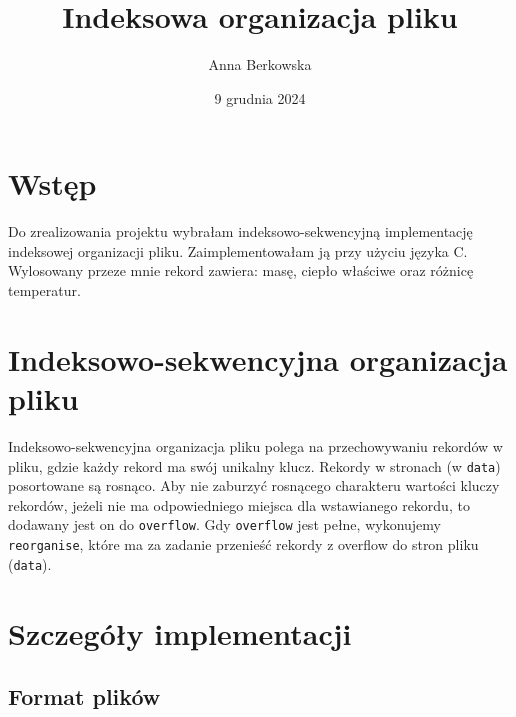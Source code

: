 \documentclass{article}
\title{Indeksowa organizacja pliku}
\author{Anna Berkowska}
\date{9 grudnia 2024}
\begin{document}
    \maketitle
    \section*{Wstęp}

    Do zrealizowania projektu wybrałam indeksowo-sekwencyjną implementację indeksowej organizacji pliku.
    Zaimplementowałam ją przy użyciu języka C. Wylosowany przeze mnie rekord zawiera: masę, ciepło właściwe oraz różnicę temperatur.

    \section*{Indeksowo-sekwencyjna organizacja pliku}

    Indeksowo-sekwencyjna organizacja pliku polega na przechowywaniu rekordów w pliku, gdzie każdy rekord ma swój unikalny klucz.
    Rekordy w stronach (w \texttt{data}) posortowane są rosnąco.
    Aby nie zaburzyć rosnącego charakteru wartości kluczy rekordów, jeżeli nie ma odpowiedniego miejsca dla wstawianego rekordu,
    to dodawany jest on do \texttt{overflow}. Gdy \texttt{overflow} jest pełne, wykonujemy \texttt{reorganise}, które ma za zadanie przenieść rekordy z overflow
    do stron pliku (\texttt{data}).

    \section*{Szczegóły implementacji}

    \subsection*{Format plików}
\end{document}
